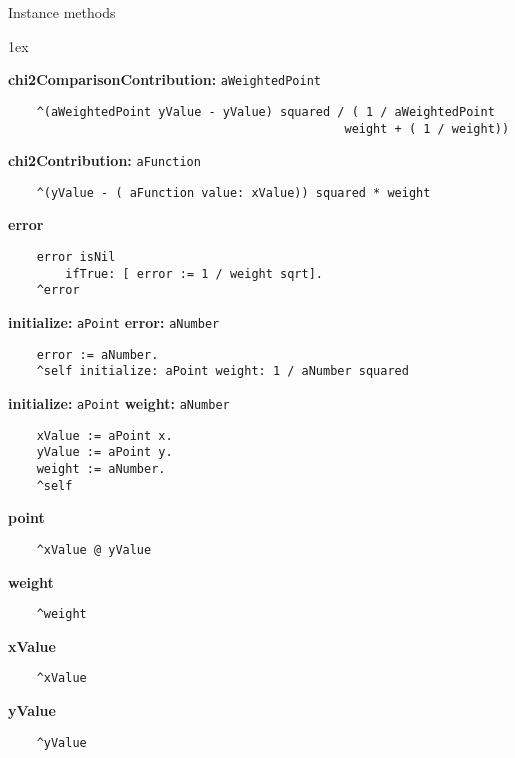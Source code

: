 Instance methods
{\parskip 1ex\par\noindent}
{\bf chi2ComparisonContribution:} {\tt aWeightedPoint}
\begin{verbatim}
    ^(aWeightedPoint yValue - yValue) squared / ( 1 / aWeightedPoint 
                                               weight + ( 1 / weight))

\end{verbatim}
{\bf chi2Contribution:} {\tt aFunction}
\begin{verbatim}
    ^(yValue - ( aFunction value: xValue)) squared * weight

\end{verbatim}
{\bf error}
\begin{verbatim}
    error isNil
        ifTrue: [ error := 1 / weight sqrt].
    ^error

\end{verbatim}
{\bf initialize:} {\tt aPoint} {\bf error:} {\tt aNumber}
\begin{verbatim}
    error := aNumber.
    ^self initialize: aPoint weight: 1 / aNumber squared

\end{verbatim}
{\bf initialize:} {\tt aPoint} {\bf weight:} {\tt aNumber}
\begin{verbatim}
    xValue := aPoint x.
    yValue := aPoint y.
    weight := aNumber.
    ^self

\end{verbatim}
{\bf point}
\begin{verbatim}
    ^xValue @ yValue

\end{verbatim}
{\bf weight}
\begin{verbatim}
    ^weight

\end{verbatim}
{\bf xValue}
\begin{verbatim}
    ^xValue

\end{verbatim}
{\bf yValue}
\begin{verbatim}
    ^yValue

\end{verbatim}

